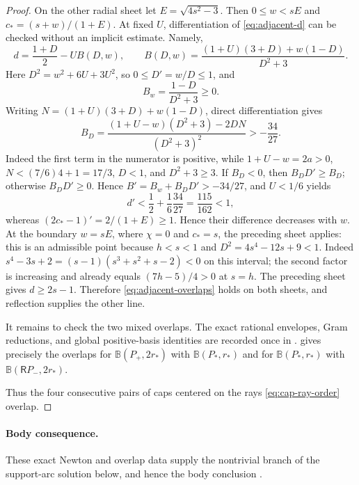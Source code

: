 \begin{proof}
On the other radial sheet let $E=\sqrt{4s^2-3}$.  Then
$0\le w<sE$ and $c_*=(s+w)/(1+E)$.  At fixed $U$, differentiation of
\eqref{eq:adjacent-d} can be checked without an implicit estimate.  Namely,
\[
 d=\frac{1+D}{2}-UB(D,w),\qquad
 B(D,w)=\frac{(1+U)(3+D)+w(1-D)}{D^2+3}.
\]
Here $D^2=w^2+6U+3U^2$, so $0\le D'=w/D\le1$, and
\[
 B_w=\frac{1-D}{D^2+3}\ge0.
\]
Writing $N=(1+U)(3+D)+w(1-D)$, direct differentiation gives
\[
 B_D=\frac{(1+U-w)(D^2+3)-2DN}{(D^2+3)^2}>-\frac{34}{27}.
\]
Indeed the first term in the numerator is positive, while
$1+U-w=2a>0$, $N<(7/6)4+1=17/3$, $D<1$, and $D^2+3\ge3$.  If $B_D<0$, then
$B_DD'\ge B_D$; otherwise $B_DD'\ge0$.  Hence
$B'=B_w+B_DD'>-34/27$, and $U<1/6$ yields
\[
 d'<\frac12+\frac16\frac{34}{27}=\frac{115}{162}<1,
\]
whereas
$(2c_*-1)'=2/(1+E)\ge1$.  Hence their difference decreases with $w$.
At the boundary $w=sE$, where $\chi=0$ and $c_*=s$, the preceding sheet
applies: this is an admissible point because $h<s<1$ and
$D^2=4s^4-12s+9<1$.  Indeed
$s^4-3s+2=(s-1)(s^3+s^2+s-2)<0$ on this interval; the second factor is
increasing and already equals $(7h-5)/4>0$ at $s=h$.  The preceding sheet gives
$d\ge2s-1$.  Therefore \eqref{eq:adjacent-overlaps} holds on both
sheets, and reflection supplies the other line.

It remains to check the two mixed overlaps.  The exact rational envelopes,
Gram reductions, and global positive-basis identities are recorded once in
.
 gives precisely the overlaps for
$\mathbb B(P_+,2r_*)$ with $\mathbb B(P_*,r_*)$ and for
$\mathbb B(P_*,r_*)$ with $\mathbb B(\mathsf R P_-,2r_*)$.

Thus the four consecutive pairs of caps centered on the rays
\eqref{eq:cap-ray-order} overlap.
\end{proof}

\paragraph{Body consequence.}
These exact Newton and overlap data supply the nontrivial branch of the
support-arc solution below, and hence the body conclusion
.
